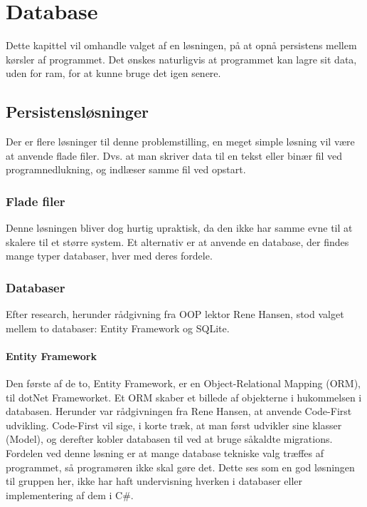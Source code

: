 \chapter{Database}\label{chap:database}

Dette kapittel vil omhandle valget af en løsningen, på at opnå persistens mellem kørsler af programmet.
Det ønskes naturligvis at programmet kan lagre sit data, uden for ram, for at kunne bruge det igen senere.

\section{Persistensløsninger}

Der er flere løsninger til denne problemstilling, en meget simple løsning vil være at anvende flade filer. 
Dvs. at man skriver data til en tekst eller binær fil ved programnedlukning, og indlæser samme fil ved opstart.

\subsection{Flade filer}
Denne løsningen bliver dog hurtig upraktisk, da den ikke har samme evne til at skalere til et større system.
Et alternativ er at anvende en database, der findes mange typer databaser, hver med deres fordele.

\subsection{Databaser}
Efter research, herunder rådgivning fra OOP lektor Rene Hansen, stod valget mellem to databaser: Entity Framework og SQLite.

\subsubsection*{Entity Framework}
Den første af de to, Entity Framework, er en Object-Relational Mapping (ORM), til dotNet Frameworket.
Et ORM skaber et billede af objekterne i hukommelsen i databasen. 
Herunder var rådgivningen fra Rene Hansen, at anvende Code-First udvikling. 
Code-First vil sige, i korte træk, at man først udvikler sine klasser (Model), og derefter kobler databasen til ved at bruge såkaldte migrations. 
Fordelen ved denne løsning er at mange database tekniske valg træffes af programmet, så programøren ikke skal gøre det. 
Dette ses som en god løsningen til gruppen her, ikke har haft undervisning hverken i databaser eller implementering af dem i C\#.

